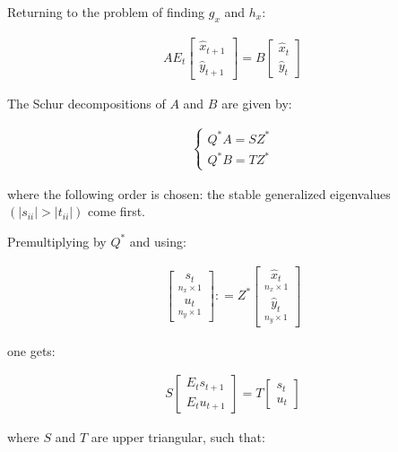 \documentclass{pracamgr}
\numberwithin{equation}{section}
\begin{document}
Returning to the problem of finding $g_x$ and $h_x$:

\begin{eqnarray}
    A E_t \begin{bmatrix} \widehat{x}_{t+1} \\ \widehat{y}_{t+1} \end{bmatrix} = B\begin{bmatrix} \widehat{x}_t\\ \widehat{y}_t \end{bmatrix}
  \end{eqnarray}

The Schur decompositions of $A$ and $B$ are given by:

\begin{align}
\left\{
\begin{array}{cl}
Q^* A = S Z^* \\
Q^* B = T Z^*
\end{array}
\right.
\end{align}

where the following order is chosen: the stable generalized eigenvalues $(|s_{ii}|>|t_{ii}|)$ come first. 

Premultiplying by $Q^*$ and using:

\begin{align}
\begin{bmatrix} \underset{n_x \times 1}{s_t} \\ \underset{n_y\times1}{u_t} \end{bmatrix} : = Z^* \begin{bmatrix} \underset{n_x \times 1}{\widehat{x}_t} \\ \underset{n_y \times 1}{\widehat{y}_t} \end{bmatrix}\end{align}

one gets:

\begin{align}
  S  \begin{bmatrix} E_t s_{t+1}\\ E_t u_{t+1} \end{bmatrix} = T \begin{bmatrix} s_t \\ u_t \end{bmatrix}
\end{align}

where $S$ and $T$ are upper triangular, such that:
\end{document}
